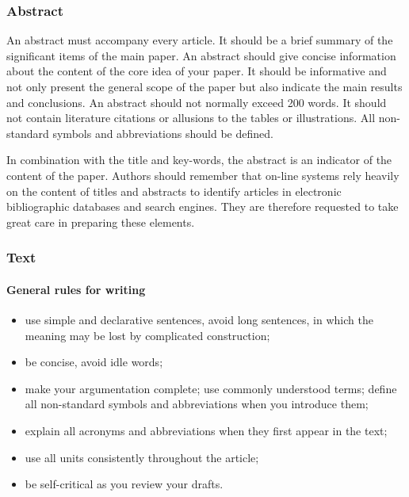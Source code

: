 \documentclass[USenglish,oneside,twocolumn]{article}
\begin{document}
\subsubsection{Abstract}

An abstract must accompany every article. It should be a brief summary of the significant items of the main paper. An abstract should give concise information about the content of the core idea of your paper. It should be informative and not only present the general scope of the paper but also indicate the main results and conclusions. An abstract should not normally exceed 200 words. It should not contain literature citations or allusions to the tables or illustrations. All non-standard symbols and abbreviations should be defined.

In combination with the title and key-words, the abstract is an indicator of the content of the paper. Authors should remember that on-line systems rely heavily on the content of titles and abstracts to identify articles in electronic bibliographic databases and search engines. They are therefore requested to take great care in preparing these elements.


\subsubsection{Text}

\paragraph{General rules for writing}
\begin{itemize}
    \item use simple and declarative sentences, avoid long sentences, in which the meaning may be lost by complicated construction;
    \item be concise, avoid idle words;
    \item make your argumentation complete; use commonly understood terms; define all non-standard symbols and abbreviations when you introduce them;
    \item explain all acronyms and abbreviations when they first appear in the text;
    \item use all units consistently throughout the article;
    \item be self-critical as you review your drafts.
\end{itemize}
\end{document}
